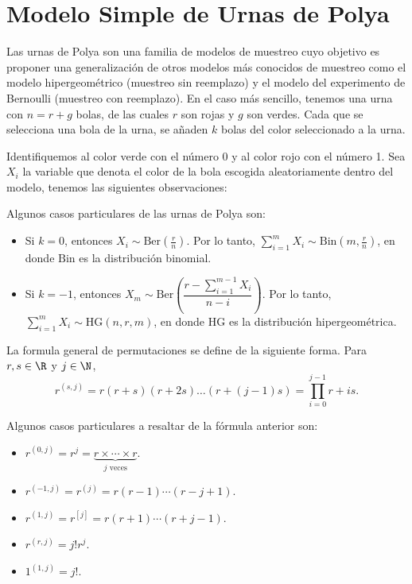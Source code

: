 \section{Modelo Simple de Urnas de Polya}

Las urnas de Polya son una familia de modelos de muestreo cuyo objetivo es proponer una generalización de otros modelos más conocidos de muestreo como el modelo hipergeométrico (muestreo sin reemplazo) y el modelo del experimento de Bernoulli (muestreo con reemplazo). En el caso más sencillo, tenemos una urna con $n = r+g$ bolas, de las cuales $r$ son rojas y $g$ son verdes. Cada que se selecciona una bola de la urna, se añaden $k$ bolas del color seleccionado a la urna.

Identifiquemos al color verde con el número 0 y al color rojo con el número 1. Sea $X_i$ la variable que denota el color de la bola escogida aleatoriamente dentro del modelo, tenemos las siguientes observaciones:

\begin{remark} Algunos casos particulares de las urnas de Polya son:
    \begin{itemize}
        \item Si $k = 0$, entonces $X_i \sim \text{Ber}\left( \frac{r}{n} \right)$. Por lo tanto, $\sum_{i = 1}^{m} X_i \sim \text{Bin}(m,\frac{r}{n})$, en donde $\text{Bin}$ es la distribución binomial.
        \item Si $k = -1$, entonces $X_m \sim \text{Ber}\left( \dfrac{r-\sum_{i = 1}^{m-1} X_i}{n-i} \right)$. Por lo tanto, $\sum_{i = 1}^{m} X_i \sim \text{HG}(n,r,m)$, en donde $\text{HG}$ es la distribución hipergeométrica.
    \end{itemize}
\end{remark}

\begin{definition} 
    La formula general de permutaciones se define de la siguiente forma. Para $r,s\in\R$ y $j\in \N$,
    \[ r^{(s,j)} = r(r+s)(r+2s)\ldots(r+(j-1)s) = \prod_{i = 0}^{j-1} r+is. \]
\end{definition}

\begin{remark} Algunos casos particulares a resaltar de la fórmula anterior son:
    \begin{itemize}
        \item $r^{(0,j)} = r^j = \underbrace{r\times\cdots\times r}_{j\text{ veces}}$.
        \item $r^{(-1,j)} = r^{(j)} = r(r-1)\cdots (r-j+1)$.
        \item $r^{(1,j)} = r^{[j]} = r(r+1)\cdots(r+j-1)$.
        \item $r^{(r,j)} = j! r^j$.
        \item $1^{(1,j)} = j!$.
    \end{itemize}
\end{remark}
